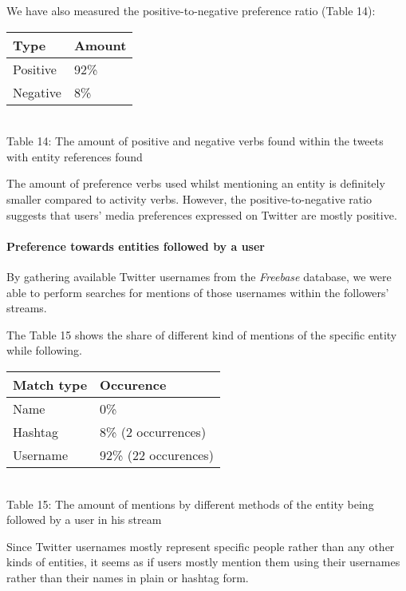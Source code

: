 We have also measured the positive-to-negative preference ratio (Table 14):

\begin{center}
  \begin{tabular}{ | p{3cm}| p{2cm} | } \hline
    Type & Amount \\ \hline
    Positive & 92\% \\ \hline
    Negative & 8\% \\ \hline
  \end{tabular} \\
  Table 14: The amount of positive and negative verbs found within the tweets with entity references found \\
\end{center}

The amount of preference verbs used whilst mentioning an entity is definitely
smaller compared to activity verbs. However, the positive-to-negative ratio suggests that users'
media preferences expressed on Twitter are mostly positive.

\paragraph{Preference towards entities followed by a user}
By gathering available Twitter usernames from the \textit{Freebase} database,
we were able to perform searches for mentions of those usernames within the followers' streams.

The Table 15 shows the share of different kind of mentions of the specific entity while following.

\begin{center}
  \begin{tabular}{ | p{3cm}| p{2cm} | } \hline
    Match type & Occurence \\ \hline
    Name & 0\% \\ \hline
    Hashtag & 8\% (2 occurrences) \\ \hline
    Username & 92\% (22 occurences) \\ \hline
  \end{tabular} \\
  Table 15: The amount of mentions by different methods of the entity being followed by a user in his stream \\
\end{center}

Since Twitter usernames mostly represent specific people rather than any other kinds of entities, it seems as if users mostly
mention them using their usernames rather than their names in plain or hashtag form.

